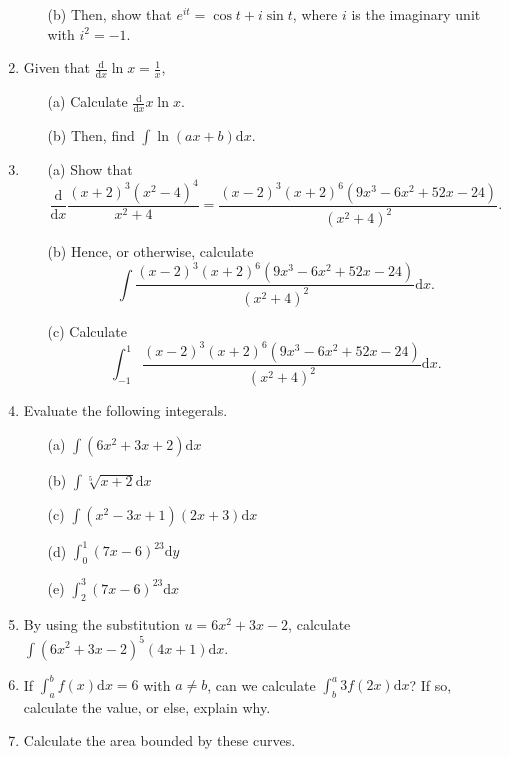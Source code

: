 \documentclass{article}
\begin{document}
\begin{enumerate}
\begin{itemize}
              \item[(b)] Then, show that $e^{it}=\cos t+i\sin t$, where $i$ is the imaginary unit with $i^2=-1$.
       \end{itemize}
\item Given that $\displaystyle \frac{\mathrm d}{\mathrm dx}\ln x=\frac 1x$,
       \begin{itemize}
              \item[(a)] Calculate $\displaystyle\frac{\mathrm d}{\mathrm dx} x\ln x$.
              \item[(b)] Then, find $\displaystyle \int\ln(ax+b)\mathrm dx$.
       \end{itemize}
\item \begin{itemize}
              \item[(a)] Show that \[\frac{\mathrm d}{\mathrm dx}\frac{(x+2)^3(x^2-4)^4}{x^2+4}=\frac{(x-2)^3(x+2)^6(9x^3-6x^2+52x-24)}{(x^2+4)^2}.\]
              \item[(b)] Hence, or otherwise, calculate \[\int \frac{(x-2)^3(x+2)^6(9x^3-6x^2+52x-24)}{(x^2+4)^2}\mathrm dx.\]
              \item[(c)] Calculate \[\int_{-1}^1 \frac{(x-2)^3(x+2)^6(9x^3-6x^2+52x-24)}{(x^2+4)^2}\mathrm dx.\]
       \end{itemize}
\item Evaluate the following integerals.
        \begin{itemize}
              \item[(a)] $\displaystyle \int (6x^2+3x+2)\mathrm dx$
              \item[(b)] $\displaystyle \int \sqrt[5]{x+2}\mathrm dx$
              \item[(c)] $\displaystyle \int (x^2-3x+1)(2x+3)\mathrm dx$
              \item[(d)] $\displaystyle \int_0^1 (7x-6)^{23}\mathrm dy$
              \item[(e)] $\displaystyle \int_2^3 (7x-6)^{23}\mathrm dx$
       \end{itemize}
\item By using the substitution $u=6x^2+3x-2$, calculate $\displaystyle \int (6x^2+3x-2)^5(4x+1)\mathrm dx$.
\item If $\displaystyle \int_a^b f(x)\mathrm dx=6$ with $a\neq b$, can we calculate $\displaystyle \int_b^a 3f(2x)\mathrm dx$? If so, calculate the value, or else, explain why.
\item Calculate the area bounded by these curves.
       \begin{itemize}

\end{itemize}
\end{enumerate}
\end{document}
